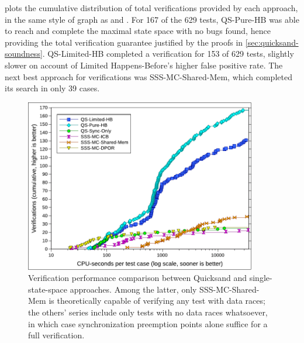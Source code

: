  plots the cumulative distribution of total verifications provided by each approach,
in the same style of graph as  and .
For 167 of the 629 tests,
QS-Pure-HB was able to reach and complete the maximal state space with no bugs found,
hence providing the total verification guarantee justified by the proofs in \cref{sec:quicksand-soundness}.
QS-Limited-HB completed a verification for 153 of 629 tests,
slightly slower on account of Limited Happens-Before's higher false positive rate.
The next best approach for verifications was SSS-MC-Shared-Mem, which completed its search in only 39 cases.

\begin{figure}[t]
	\begin{center}
	\includegraphics[width=0.9\textwidth]{../proposal/totalverifs-v2.pdf}
	\end{center}
	\caption[Verification performance comparison
	between Quicksand and prior work.]
	{Verification performance comparison between
	Quicksand and single-state-space approaches.
	Among the latter, only SSS-MC-Shared-Mem is theoretically capable of verifying any test with data races;
	the others' series include only tests with no data races whatsoever,
	in which case synchronization preemption points alone suffice for a full verification.}
	\label{fig:totalverif}
\end{figure}

